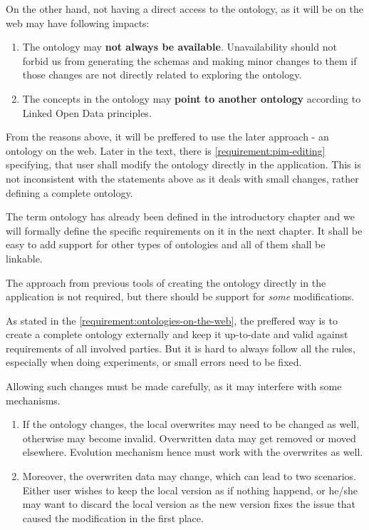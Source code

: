 On the other hand, not having a direct access to the ontology, as it will be on the web may have following impacts:

\begin{enumerate}
    \item The ontology may \textbf{not always be available}. Unavailability should not forbid us from generating the schemas and making minor changes to them if those changes are not directly related to exploring the ontology.
    \item The concepts in the ontology may \textbf{point to another ontology} according to Linked Open Data principles.
\end{enumerate}

From the reasons above, it will be preffered to use the later approach - an ontology on the web. Later in the text, there is \autoref{requirement:pim-editing} specifying, that user shall modify the ontology directly in the application. This is not inconsistent with the statements above as it deals with small changes, rather defining a complete ontology.

The term ontology has already been defined in the introductory chapter and we will formally define the specific requirements on it in the next chapter. It shall be easy to add support for other types of ontologies and all of them shall be linkable.


\begin{requirement}
    \label{requirement:pim-editing}
    The approach from previous tools of creating the ontology directly in the application is not required, but there should be support for \textit{some} modifications.
\end{requirement}

As stated in the \autoref{requirement:ontologies-on-the-web}, the preffered way is to create a complete ontology externally and keep it up-to-date and valid against requirements of all involved parties. But it is hard to always follow all the rules, especially when doing experiments, or small errors need to be fixed.

Allowing such changes must be made carefully, as it may interfere with some mechanisms.
\begin{enumerate}
    \item If the ontology changes, the local overwrites may need to be changed as well, otherwise may become invalid. Overwritten data may get removed or moved elsewhere. Evolution mechanism hence must work with the overwrites as well.
    \item Moreover, the overwriten data may change, which can lead to two scenarios. Either user wishes to keep the local version as if nothing happend, or he/she may want to discard the local version as the new version fixes the issue that caused the modification in the first place.
\end{enumerate}

